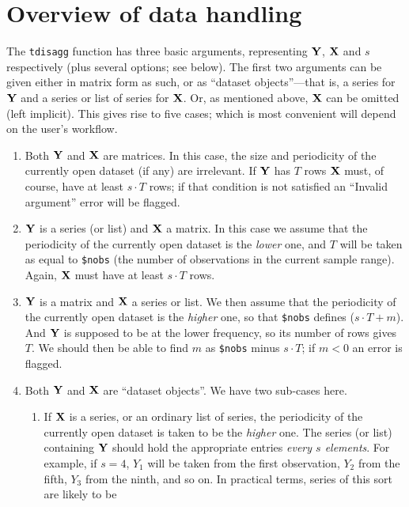 \section{Overview of data handling}
\label{sec:tdisagg-data}

The \texttt{tdisagg} function has three basic arguments, representing
$\mathbf{Y}$, $\mathbf{X}$ and $s$ respectively (plus several options; see
below). The first two arguments can be given either in matrix form as
such, or as ``dataset objects''---that is, a series for $\mathbf{Y}$ and a
series or list of series for $\mathbf{X}$. Or, as mentioned above, $\mathbf{X}$ can
be omitted (left implicit). This gives rise to five cases; which is
most convenient will depend on the user's workflow.

\begin{enumerate}
\item Both $\mathbf{Y}$ and $\mathbf{X}$ are matrices. In this case, the size and
  periodicity of the currently open dataset (if any) are irrelevant.
  If $\mathbf{Y}$ has $T$ rows $\mathbf{X}$ must, of course, have at least
  $s \cdot T$ rows; if that condition is not satisfied an ``Invalid
  argument'' error will be flagged.
\item $\mathbf{Y}$ is a series (or list) and $\mathbf{X}$ a matrix. In this case we
  assume that the periodicity of the currently open dataset is the
  \emph{lower} one, and $T$ will be taken as equal to \texttt{\$nobs}
  (the number of observations in the current sample range). Again,
  $\mathbf{X}$ must have at least $s \cdot T$ rows.
\item $\mathbf{Y}$ is a matrix and $\mathbf{X}$ a series or list.  We then assume
  that the periodicity of the currently open dataset is the
  \emph{higher} one, so that \texttt{\$nobs} defines
  ($s \cdot T + m$). And $\mathbf{Y}$ is supposed to be at the lower
  frequency, so its number of rows gives $T$. We should then be able
  to find $m$ as \texttt{\$nobs} minus $s \cdot T$; if $m < 0$ an
  error is flagged.
\item Both $\mathbf{Y}$ and $\mathbf{X}$ are ``dataset objects''.  We have two
  sub-cases here.
  \begin{enumerate}
  \item If $\mathbf{X}$ is a series, or an ordinary list of series, the
    periodicity of the currently open dataset is taken to be the
    \emph{higher} one. The series (or list) containing $\mathbf{Y}$ should
    hold the appropriate entries \emph{every $s$ elements}. For
    example, if $s = 4$, $Y_1$ will be taken from the first
    observation, $Y_2$ from the fifth, $Y_3$ from the ninth, and so
    on. In practical terms, series of this sort are likely to be

\end{enumerate}
\end{enumerate}
